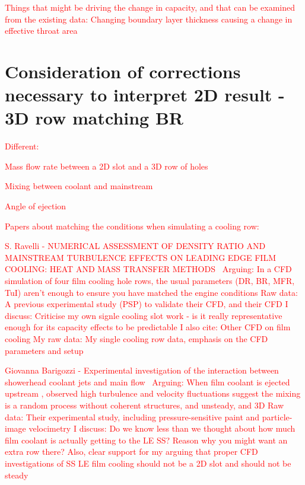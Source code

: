 \documentclass[a4paper, 11pt, oneside]{report}
\begin{document}
\textcolor{red}{Things that might be driving the change in capacity, and that can be examined from the existing data:}
	\textcolor{red}{Changing boundary layer thickness causing a change in effective throat area}

    
    
    
    
    
    
    
    
    
\section{Consideration of corrections necessary to interpret 2D result - 3D row matching BR}
\label{quasi_3D_cfd}

\textcolor{red}{Different:}

\textcolor{red}{Mass flow rate between a 2D slot and a 3D row of holes}

\textcolor{red}{Mixing between coolant and mainstream}

\textcolor{red}{Angle of ejection}

\textcolor{red}{Papers about matching the conditions when simulating a cooling row:}

\textcolor{red}{S. Ravelli - NUMERICAL ASSESSMENT OF DENSITY RATIO AND MAINSTREAM TURBULENCE EFFECTS ON LEADING EDGE FILM COOLING: HEAT AND MASS TRANSFER METHODS~\cite{ravelli_engine_conditions}}
		\textcolor{red}{Arguing: In a CFD simulation of four film cooling hole rows, the usual parameters (DR, BR, MFR, TuI) aren't enough to ensure you have matched the engine conditions}
		\textcolor{red}{Raw data: A previous experimental study (PSP) to validate their CFD, and their CFD}
		\textcolor{red}{I discuss: Criticise my own signle cooling slot work - is it really representative enough for its capacity effects to be predictable}
		\textcolor{red}{I also cite: Other CFD on film cooling}
		\textcolor{red}{My raw data: My single cooling row data, emphasis on the CFD parameters and setup}
		
\textcolor{red}{Giovanna Barigozzi - Experimental investigation of the interaction between showerhead coolant jets and main flow~\cite{barigozzi_film_cooling}}
		\textcolor{red}{Arguing: When film coolant is ejected upstream , observed high turbulence and velocity fluctuations suggest the mixing is a random process without coherent structures, and unsteady, and 3D}
		\textcolor{red}{Raw data: Their experimental study, including pressure-sensitive paint and particle-image velocimetry}
		\textcolor{red}{I discuss: Do we know less than we thought about how much film coolant is actually getting to the LE SS? Reason why you might want an extra row there? Also, clear support for my arguing that proper CFD investigations of SS LE film cooling should not be a 2D slot and should not be steady}
		
\end{document}
